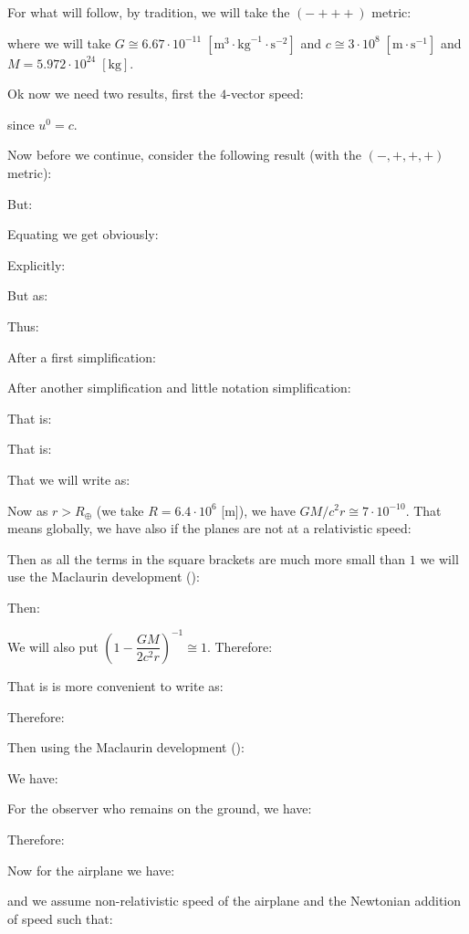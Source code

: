 	For what will follow, by tradition, we will take the $(- + + +)$ metric:
	
	where we will take $G \cong 6.67\cdot 10^{-11}\;[\text{m}^3\cdot \text{kg}^{-1}\cdot \text{s}^{-2}]$ and $c \cong 3 \cdot 10^8\;[\text{m}\cdot \text{s}^{-1}]$ and $M = 5.972\cdot 10^{24}\; [\text{kg}]$.
	
	Ok now we need two results, first the $4$-vector speed:
	
	since $u^0=c$.
	
	Now before we continue, consider the following result (with the $(-, +, +, +)$ metric):
	
	But:
	
	Equating we get obviously:
	
	Explicitly:
	
	But as:
	
	Thus:
	
	After a first simplification:
	
	After another simplification and little notation simplification:
	
	That is:
	
	That is:
	
	That we will write as:
	
	Now as $r>R_{\oplus}$ (we take $R=6.4\cdot 10^6$ [m]), we have $GM/c^2r\cong 7\cdot 10^{-10}$. That means globally, we have also if the planes are not at a relativistic speed:
	
	Then as all the terms in the square brackets are much more small than $1$ we will use the Maclaurin development ():
	
	Then:
	
	We will also put $\left(1-\dfrac{GM}{2c^2r}\right)^{-1}\cong 1$. Therefore:
	
	That is is more convenient to write as:
	
	Therefore:
	
	Then using the Maclaurin development ():
	
	We have:
	
	For the observer who remains on the ground, we have:
	
	Therefore:
	
	Now for the airplane we have:
	
	and we assume non-relativistic speed of the airplane and the Newtonian addition of speed such that:
	
